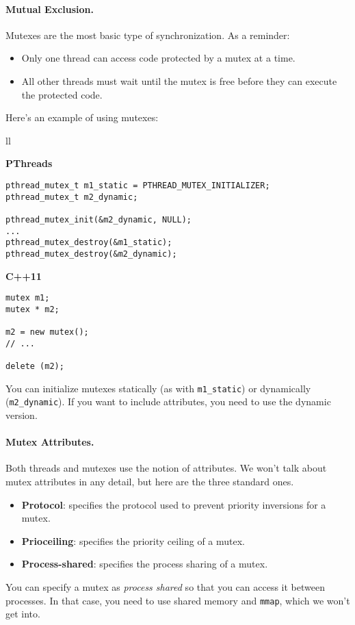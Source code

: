 \paragraph{Mutual Exclusion.} Mutexes are the most basic type of synchronization.
As a reminder:
    \begin{itemize}
    \item Only one thread can access code protected by a mutex at a time.
    \item All other threads must wait until the mutex is free before they can
      execute the protected code.
    \end{itemize}

    Here's an example of using mutexes:
    
    \begin{tabular}{ll}
      \begin{minipage}{.65\textwidth}
        {\bf PThreads}
  \begin{verbatim}
pthread_mutex_t m1_static = PTHREAD_MUTEX_INITIALIZER;
pthread_mutex_t m2_dynamic;

pthread_mutex_init(&m2_dynamic, NULL);
...
pthread_mutex_destroy(&m1_static);
pthread_mutex_destroy(&m2_dynamic);
  \end{verbatim}
      \end{minipage}
      \begin{minipage}{.35\textwidth}
        {\bf C++11}
  \begin{verbatim}
mutex m1;
mutex * m2;

m2 = new mutex();
// ...

delete (m2);
  \end{verbatim}
      \end{minipage}
    \end{tabular}

You can initialize mutexes statically (as with {\tt m1\_static}) or
dynamically ({\tt m2\_dynamic}). If you want to include attributes,
you need to use the dynamic version.

\paragraph{Mutex Attributes.} Both threads and mutexes use the notion of attributes.
We won't talk about mutex attributes in any detail, but here are the three standard ones.
  \begin{itemize}
    \item {\bf Protocol}: specifies the protocol used to prevent priority
      inversions for a mutex.
    \item {\bf Prioceiling}: specifies the priority ceiling of a mutex.
    \item {\bf Process-shared}: specifies the process sharing of a mutex.
  \end{itemize}
  You can specify a mutex as {\it process shared} so that you can access it
  between processes. In that case, you need to use shared memory and {\tt mmap},
  which we won't get into.


